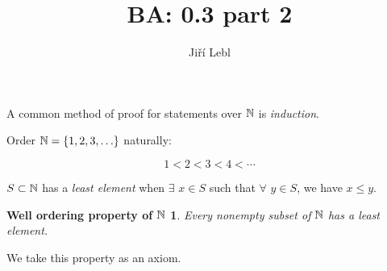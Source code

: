 \documentclass[10pt,aspectratio=149]{beamer}
\author{Ji\v{r}\'i Lebl}
\institute[OSU]{%
Departemento pri Matematiko de Oklahoma {\^S}tata Universitato}
\title{BA: 0.3 part 2}
\date{}
\begin{document}
\theoremstyle{plain}
\newtheorem*{wellordprop}{Well ordering property of ${\mathbb{N}}$}

\begin{frame}
\titlepage
\end{frame}

\begin{frame}
A common method of proof for statements over ${\mathbb{N}}$ is \emph{induction}.

\medskip
\pause

Order ${\mathbb{N}} = \{ 1,2,3,\ldots \}$ naturally:

\[
1 < 2 < 3 < 4 < \cdots 
\]

\medskip
\pause

$S \subset {\mathbb{N}}$ has a \emph{least element} when $\exists$ $x \in S$ such that
$\forall$
$y \in S$, we have $x \leq y$.

\pause

\begin{wellordprop}
Every nonempty subset of ${\mathbb{N}}$ has a least element.
\end{wellordprop}

\pause

We take this property as an axiom.

\end{frame}
\end{document}
